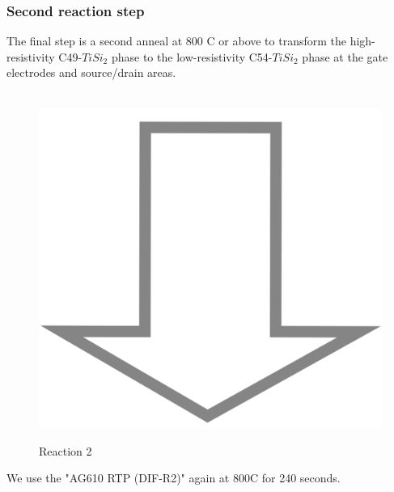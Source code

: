 \subsubsection{Second reaction step}

The final step is a second anneal at 800 \degree C or above to transform the high-resistivity C49-$TiSi_2$ phase to the low-resistivity C54-$TiSi_2$ phase at the gate electrodes and source/drain areas.

\begin{figure}[H]
	\centering
	\begin{tikzpicture}[node distance = 3cm, auto, thick,scale=\CrossSectionOnly, every node/.style={transform shape}]
		
	\end{tikzpicture}\\
	\includegraphics[scale=0.01]{down_arrow.png}\\
	\begin{tikzpicture}[node distance = 3cm, auto, thick,scale=\CrossSectionOnly, every node/.style={transform shape}]
		
	\end{tikzpicture}
	\caption{Reaction 2}
\end{figure}

We use the "AG610 RTP (DIF-R2)" again at 800\degree C for 240 seconds.